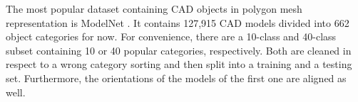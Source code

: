 The most popular dataset containing CAD objects in polygon mesh representation is ModelNet \cite{conf/cvpr/WuSKYZTX15}.
It contains 127,915 CAD models divided into 662 object categories for now.
For convenience, there are a 10-class and 40-class subset containing 10 or 40 popular categories, respectively.
Both are cleaned in respect to a wrong category sorting and then split into a training and a testing set.
Furthermore, the orientations of the models of the first one are aligned as well.